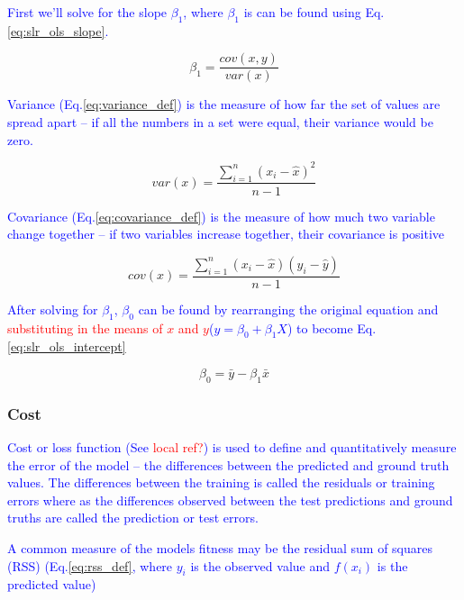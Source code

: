 \textcolor{blue}{First we'll solve for the slope $\beta_1$, where $\beta_1$ is can be found using Eq.\ref{eq:slr_ols_slope}.}

\begin{equation}
{\beta_1 =  \frac{cov(x,y)}{var(x)}}
\label{eq:slr_ols_slope}
\end{equation}

\textcolor{blue}{Variance (Eq.\ref{eq:variance_def}) is the measure of how far the set of values are spread apart -- if all the numbers in a set were equal, their variance would be zero.}

\begin{equation}
{var(x) = \frac{\sum_{i=1}^{n}(x_i - \hat{x})^2}{n-1}}
\label{eq:variance_def}
\end{equation}


\textcolor{blue}{Covariance (Eq.\ref{eq:covariance_def}) is the measure of how much two variable change together -- if two variables increase together, their covariance is positive}

\begin{equation}
{cov(x) = \frac{\sum_{i=1}^{n}(x_i - \hat{x})(y_i - \hat{y})}{n-1}}
\label{eq:covariance_def}
\end{equation}

\textcolor{blue}{After solving for $\beta_1$, $\beta_0$ can be found by rearranging the original equation and \textcolor{red}{substituting in the means of $x$ and $y$}($y=\beta_0 + \beta_1 X$) to become Eq.\ref{eq:slr_ols_intercept}}

\begin{equation}
{\beta_0 =  \bar{y} - \beta_1 \bar{x}}
\label{eq:slr_ols_intercept}
\end{equation}

\subsubsection{Cost}

\textcolor{blue}{Cost or loss function (See \textcolor{red}{local ref?}) is used to define and quantitatively measure the error of the model -- the differences between the predicted and ground truth values. The differences between the training is called the residuals or training errors where as the differences observed between the test predictions and ground truths are called the prediction or test errors.}

\textcolor{blue}{A common measure of the models fitness may be the {residual sum of squares (RSS)} (Eq.\ref{eq:rss_def}, where $y_i$ is the observed value and $f(x_i)$ is the predicted value)}

